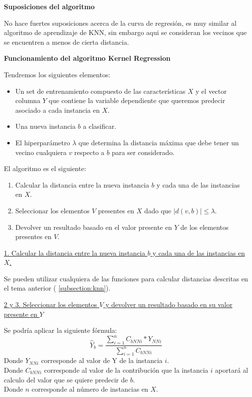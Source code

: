 \documentclass[11pt,fleqn]{book} %
\begin{document}
\textbf{Suposiciones del algoritmo}

No hace fuertes suposiciones acerca de la curva de regresión, es muy similar al algoritmo de aprendizaje de KNN, sin embargo aqui se consideran los vecinos que se encuentren a menos de cierta distancia.

\textbf{Funcionamiento del algoritmo Kernel Regression}

Tendremos los siguientes elementos:

\begin{itemize}
\item Un set de entrenamiento compuesto de las características $X$ y el vector columna $Y$ que contiene la variable dependiente que queremos predecir asociado a cada instancia en $X$.
\item Una nueva instancia $b$ a clasificar. 
\item El hiperparámetro $\lambda$ que determina la distancia máxima que debe tener un 	vecino cualquiera $v$ respecto a $b$ para ser considerado.
\end{itemize}

El algoritmo es el siguiente:
\begin{enumerate}
\item Calcular la distancia entre la nueva instancia $b$ y cada una de las instancias en $X$.
\item Seleccionar los elementos $V$ presentes en $X$ dado que $|d(v,b)|\leq \lambda$.
\item Devolver un resultado basado en el valor presente en $Y$ de los elementos presentes en $V$.
\end{enumerate}

\underline{1. Calcular la distancia entre la nueva instancia $b$ y cada una de las instancias en $X$.}

Se pueden utilizar cualquiera de las funciones para calcular distancias descritas en el tema anterior ( \ref{subsection:knn}).

\underline{2 y 3. Seleccionar los elementos $V$ y devolver un resultado basado en su valor presente en $Y$}

Se podría aplicar la siguiente fórmula:
\begin{equation}
\hat{Y}_b=\frac{\sum_{i=1}^{n} C_{bNNi}*Y_{NNi}}{\sum_{i=1}^{n} C_{bNNi}} 
\end{equation}
Donde $Y_{NNi}$ corresponde al valor de Y de la instancia $i$.\\
Donde $C_{bNNi}$ corresponde al valor de la contribución que la instancia $i$ aportará al calculo del valor que se quiere predecir de $b$.\\
Donde $n$ corresponde al número de instancias en $X$.
\end{document}
